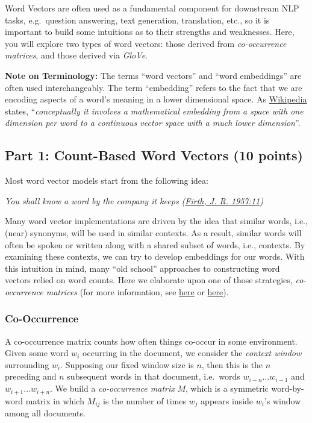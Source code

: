 \documentclass[11pt]{article}
\begin{document}
Word Vectors are often used as a fundamental component for downstream
NLP tasks, e.g.~question answering, text generation, translation, etc.,
so it is important to build some intuitions as to their strengths and
weaknesses. Here, you will explore two types of word vectors: those
derived from \emph{co-occurrence matrices}, and those derived via
\emph{GloVe}.

\textbf{Note on Terminology:} The terms ``word vectors'' and ``word
embeddings'' are often used interchangeably. The term ``embedding''
refers to the fact that we are encoding aspects of a word's meaning in a
lower dimensional space. As
\href{https://en.wikipedia.org/wiki/Word_embedding}{Wikipedia} states,
``\emph{conceptually it involves a mathematical embedding from a space
with one dimension per word to a continuous vector space with a much
lower dimension}''.

    \subsection{Part 1: Count-Based Word Vectors (10
points)}\label{part-1-count-based-word-vectors-10-points}

Most word vector models start from the following idea:

\emph{You shall know a word by the company it keeps
(\href{https://en.wikipedia.org/wiki/John_Rupert_Firth}{Firth, J. R.
1957:11})}

Many word vector implementations are driven by the idea that similar
words, i.e., (near) synonyms, will be used in similar contexts. As a
result, similar words will often be spoken or written along with a
shared subset of words, i.e., contexts. By examining these contexts, we
can try to develop embeddings for our words. With this intuition in
mind, many ``old school'' approaches to constructing word vectors relied
on word counts. Here we elaborate upon one of those strategies,
\emph{co-occurrence matrices} (for more information, see
\href{https://web.stanford.edu/~jurafsky/slp3/6.pdf}{here} or
\href{https://web.archive.org/web/20190530091127/https://medium.com/data-science-group-iitr/word-embedding-2d05d270b285}{here}).

    \subsubsection{Co-Occurrence}\label{co-occurrence}

A co-occurrence matrix counts how often things co-occur in some
environment. Given some word \(w_i\) occurring in the document, we
consider the \emph{context window} surrounding \(w_i\). Supposing our
fixed window size is \(n\), then this is the \(n\) preceding and \(n\)
subsequent words in that document, i.e.~words \(w_{i-n} \dots w_{i-1}\)
and \(w_{i+1} \dots w_{i+n}\). We build a \emph{co-occurrence matrix}
\(M\), which is a symmetric word-by-word matrix in which \(M_{ij}\) is
the number of times \(w_j\) appears inside \(w_i\)'s window among all
documents.
\end{document}
